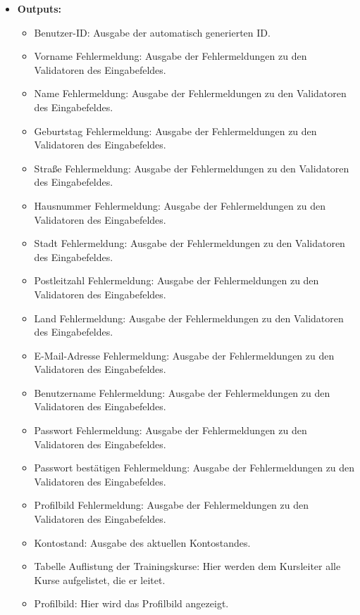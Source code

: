 \begin{itemize}
				
			\item \textbf{Outputs:}
				\begin{itemize}
					\item Benutzer-ID: Ausgabe der automatisch generierten ID.
					\item Vorname Fehlermeldung: Ausgabe der Fehlermeldungen zu den Validatoren des Eingabefeldes.
					\item Name Fehlermeldung: Ausgabe der Fehlermeldungen zu den Validatoren des Eingabefeldes.
					\item Geburtstag Fehlermeldung: Ausgabe der Fehlermeldungen zu den Validatoren des Eingabefeldes.
					\item Straße Fehlermeldung: Ausgabe der Fehlermeldungen zu den Validatoren des Eingabefeldes.
					\item Hausnummer Fehlermeldung: Ausgabe der Fehlermeldungen zu den Validatoren des Eingabefeldes.
					\item Stadt Fehlermeldung: Ausgabe der Fehlermeldungen zu den Validatoren des Eingabefeldes.
					\item Postleitzahl Fehlermeldung: Ausgabe der Fehlermeldungen zu den Validatoren des Eingabefeldes.
					\item Land Fehlermeldung: Ausgabe der Fehlermeldungen zu den Validatoren des Eingabefeldes.
					\item E-Mail-Adresse Fehlermeldung: Ausgabe der Fehlermeldungen zu den Validatoren des Eingabefeldes.
					\item Benutzername Fehlermeldung: Ausgabe der Fehlermeldungen zu den Validatoren des Eingabefeldes.
					\item Passwort Fehlermeldung: Ausgabe der Fehlermeldungen zu den Validatoren des Eingabefeldes.
					\item Passwort bestätigen Fehlermeldung: Ausgabe der Fehlermeldungen zu den Validatoren des Eingabefeldes.
					\item Profilbild Fehlermeldung: Ausgabe der Fehlermeldungen zu den Validatoren des Eingabefeldes.
					\item Kontostand: Ausgabe des aktuellen Kontostandes.
					\item Tabelle Auflistung der Trainingskurse: Hier werden dem Kursleiter alle Kurse aufgelistet, die er leitet.
					\item Profilbild: Hier wird das Profilbild angezeigt.
				\end{itemize}
				
				\begin{center}
					\begin{longtable}{|p{5cm} | p{4cm}|p{5cm}|}
						

\end{longtable}
\end{center}
\end{itemize}
